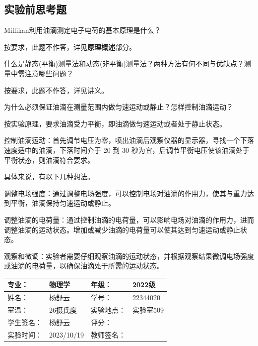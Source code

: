 \documentclass[dvipsnames, svgnames,a4paper,11pt]{article}
\begin{document}
	
	\subsection{实验前思考题}
	\begin{question}
		Millikan利用油滴测定电子电荷的基本原理是什么？
	\end{question}
	按要求，此题不作答，详见\textbf{原理概述}部分。
	
	\begin{question}
		什么是静态(平衡)测量法和动态(非平衡)测量法？两种方法有何不同与优缺点？测量中需注意哪些问题？
	\end{question}
	按要求，此题不作答，详见讲义。
	
	\begin{question}
		为什么必须保证油滴在测量范围内做匀速运动或静止？怎样控制油滴运动？
	\end{question}
	按实验原理，要求油滴受力平衡，即油滴做匀速运动或者处于静止状态。
	
	控制油滴运动：首先调节电压为零，喷出油滴后观察仪器的显示器，寻找一个下落速度适中的油滴，下落时间介于 20 到 30 秒为宜，后调节平衡电压使该油滴处于平衡状态，则油滴符合要求。
	
	具体来说，有以下几种想法。
	
	调整电场强度：通过调整电场强度，可以控制电场对油滴的作用力，使其与重力达到平衡，油滴保持匀速运动或静止。
	
	调整油滴的电荷量：通过控制油滴的电荷量，可以影响电场对油滴的作用力，进而调整油滴的运动状态。增加或减少油滴的电荷量可以使其达到匀速运动或静止状态。
	
	观察和微调：实验者需要仔细观察油滴的运动状态，并根据观察结果微调电场强度或油滴的电荷量，以确保油滴处于所需的运动状态。
	
	\clearpage
	\begin{table}
		\renewcommand\arraystretch{1.7}
		\centering
		\begin{tabularx}{\textwidth}{|X|X|X|X|}
			\hline
			专业： & 物理学 & 年级： & 2022级 \\
			\hline
			姓名： & 杨舒云 & 学号： & 22344020\\
			\hline
			室温： & 26摄氏度 & 实验地点： & 实验室509 \\
			\hline
			学生签名：& 杨舒云 & 评分： &\\
			\hline
			实验时间：& 2023/10/19 & 教师签名：&\\
			\hline
		\end{tabularx}
	\end{table}
	
\end{document}
